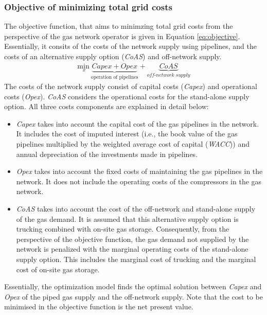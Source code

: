 \subsubsection{Objective of minimizing total grid costs}
The objective function, that aims to minimzing total grid costs from the perspective of the gas network operator is given in Equation \ref{eq:objective}. Essentially, it consits of the costs of the network supply using pipelines, and the costs of an alternative supply option (\textit{CoAS}) and off-network supply. 
\begin{align}\label{eq:objective}
	\underset{x}{\mathrm{min~}} \underbrace{Capex + Opex}_{\text{operation of pipelines}} + \underbrace{CoAS}_{\textit{off-network supply}}
\end{align}
The costs of the network supply consist of capital costs (\textit{Capex}) and operational costs (\textit{Opex}). \textit{CoAS} considers the operational costs for the stand-alone supply option. All three costs components are explained in detail below: 

\begin{itemize}
	\item \textit{Capex} takes into account the capital cost of the gas pipelines in the network. It includes the cost of imputed interest (i.e., the book value of the gas pipelines multiplied by the weighted average cost of capital (\textit{WACC})) and annual depreciation of the investments made in pipelines. 
	\item \textit{Opex} takes into account the fixed costs of maintaining the gas pipelines in the network. It does not include the operating costs of the compressors in the gas network. 
	\item \textit{CoAS} takes into account the cost of the off-network and stand-alone supply of the gas demand. It is assumed that this alternative supply option is trucking combined with on-site gas storage. Consequently, from the perspective of the objective function, the gas demand not supplied by the network is penalized with the marginal operating costs of the stand-alone supply option. This includes the marginal cost of trucking and the marginal cost of on-site gas storage.  
\end{itemize}

Essentially, the optimization model finds the optimal solution between \textit{Capex} and \textit{Opex} of the piped gas supply and the off-network supply. Note that the cost to be minimised in the objective function is the net present value.

